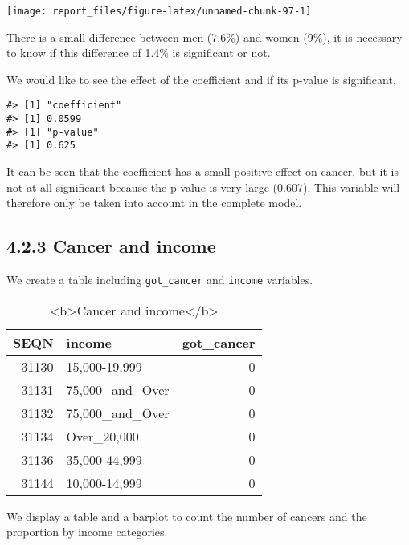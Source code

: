 \documentclass[
]{article}
\begin{document}
\begin{center}\texttt{[image: report\_files/figure-latex/unnamed-chunk-97-1]} \end{center}

There is a small difference between men (7.6\%) and women (9\%), it is
necessary to know if this difference of 1.4\% is significant or not.

We would like to see the effect of the coefficient and if its p-value is
significant.

\begin{verbatim}
#> [1] "coefficient"
#> [1] 0.0599
#> [1] "p-value"
#> [1] 0.625
\end{verbatim}

It can be seen that the coefficient has a small positive effect on
cancer, but it is not at all significant because the p-value is very
large (0.607). This variable will therefore only be taken into account
in the complete model.

\hypertarget{cancer-and-income}{%
\subsection{4.2.3 Cancer and income}\label{cancer-and-income}}

We create a table including \texttt{got\_cancer} and \texttt{income}
variables.

\begin{table}

\caption{\label{tab:unnamed-chunk-99}<b>Cancer and income</b>}
\centering
\begin{tabular}[t]{r|l|r}
\hline
SEQN & income & got\_cancer\\
\hline
31130 & 15,000-19,999 & 0\\
\hline
31131 & 75,000\_and\_Over & 0\\
\hline
31132 & 75,000\_and\_Over & 0\\
\hline
31134 & Over\_20,000 & 0\\
\hline
31136 & 35,000-44,999 & 0\\
\hline
31144 & 10,000-14,999 & 0\\
\hline
\end{tabular}
\end{table}

We display a table and a barplot to count the number of cancers and the
proportion by income categories.
\end{document}
